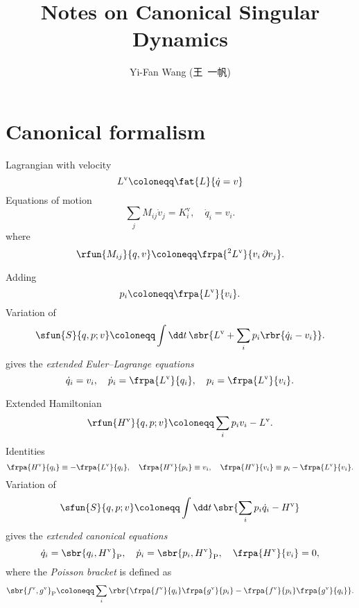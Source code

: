 \documentclass[a4paper,11pt]{article}
\title{Notes on Canonical Singular Dynamics}
\author{Yi-Fan Wang (王\ 一帆)}
\begin{document}
\maketitle

\section{Canonical formalism}

Lagrangian with velocity
\begin{equation}
L^\text{v} \coloneqq \fat{L}{\dot{q} = v}
\end{equation}
Equations of motion
\begin{equation}
\sum_j M_{ij}\dot{v}_j = K^\text{v}_i,\quad
\dot{q}_i = v_i.
\end{equation}
where
\begin{equation}
\rfun{M_{ij}}{q,v} \coloneqq \frpa{^2 L^\text{v}}{v_i\,\partial v_j}.
\end{equation}

Adding
\begin{equation}
p_i \coloneqq \frpa{L^\text{v}}{v_i}.%
\end{equation}
Variation of
\begin{equation}
\sfun{S}{q, p; v} \coloneqq \int\dd t\,\sbr{L^\text{v} + \sum_i 
p_i\rbr{\dot{q}_i - v_i}}.
\end{equation}
gives the \emph{extended Euler--Lagrange equations}
\begin{equation}
\dot{q}_i = v_i,\quad
\dot{p}_i = \frpa{L^\text{v}}{q_i},\quad
p_i = \frpa{L^\text{v}}{v_i}.
\end{equation}

Extended Hamiltonian
\begin{equation}
\rfun{H^\text{v}}{q, p; v} \coloneqq \sum_i p_i v_i - L^\text{v}.
\end{equation}
Identities
\begin{equation}
\frpa{H^\text{v}}{q_i} \equiv - \frpa{L^\text{v}}{q_i},\quad
\frpa{H^\text{v}}{p_i} \equiv v_i,\quad
\frpa{H^\text{v}}{v_i} \equiv p_i - \frpa{L^\text{v}}{v_i}.
\end{equation}
Variation of
\begin{equation}
\sfun{S}{q, p; v} \coloneqq \int\dd t\,\sbr{\sum_i 
p_i \dot{q}_i - H^\text{v}}
\end{equation}
gives the \emph{extended canonical equations}
\begin{equation}
\dot{q}_i = \sbr{q_i, H^\text{v}}_\text{P},\quad
\dot{p}_i = \sbr{p_i, H^\text{v}}_\text{P},\quad
\frpa{H^\text{v}}{v_i} = 0,
\end{equation}
where the \emph{Poisson bracket} is defined as
\begin{equation}
\sbr{f^\text{v}, g^\text{v}}_\text{P} \coloneqq 
\sum_i\rbr{\frpa{f^\text{v}}{q_i}\frpa{g^\text{v}}{p_i} -
\frpa{f^\text{v}}{p_i}\frpa{g^\text{v}}{q_i}}.
\end{equation}
\end{document}
